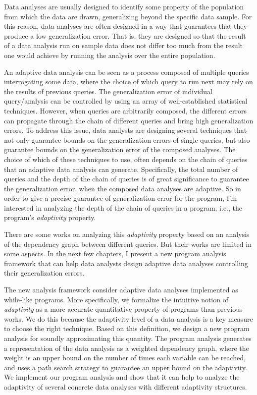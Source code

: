 
Data analyses are usually designed to identify some property of the population 
from which the data are drawn, generalizing beyond the specific data sample. 
For this reason, data analyses are often designed in a way that guarantees that they produce a low generalization error.
That is, they are designed so that the result of a data analysis run on sample data does not differ too much from the result one would achieve by running the analysis over the entire population. 

An adaptive data analysis can be seen as a process composed of multiple queries interrogating some data, where the choice of which query to run next may rely on the results of previous queries. 
The generalization error of individual query/analysis can be controlled by using an array of well-established statistical techniques.
However, when queries are arbitrarily composed, the different errors can propagate through the chain of different queries and bring high generalization errors. 
To address this issue, data analysts are designing several techniques that not only guarantee bounds on the generalization errors of single queries, but also guarantee bounds on the generalization error of the composed analyses. 
The choice of which of these techniques to use, 
often depends on the chain of queries that an adaptive data analysis can generate.
Specifically, the total number of queries and the depth of the chain of queries is of great significance 
to guarantee the generalization error, 
when the composed data analyses are adaptive. 
So in order to give a precise guarantee of generalization error
for the program,
I'm interested in analyzing the depth of the chain of queries in a program, i.e., the program's \emph{adaptivity} property.

There are some works on analyzing this \emph{adaptivity} property based on an analysis of the dependency graph between different queries.
But their works are limited in some aspects.
In the next few chapters, I present a new program analysis framework that can help data analysts design adaptive data analyses controlling their generalization errors.

The new analysis framework consider adaptive data analyses implemented as while-like programs.
More specifically, we formalize the intuitive notion of \emph{adaptivity} as a more accurate quantitative property of programs than previous works.
We do this because the adaptivity level of a data analysis is a key measure to choose the right technique. 
Based on this definition, we design a new program analysis for soundly approximating this quantity.
The program analysis generates a representation of the data analysis as a weighted dependency graph,
where the weight is an upper bound on the number of times each variable can be reached,
and uses a path search strategy to guarantee an upper bound on the adaptivity. 
We implement our program analysis and show that it can help to analyze the adaptivity of several
concrete data analyses with different adaptivity structures.

